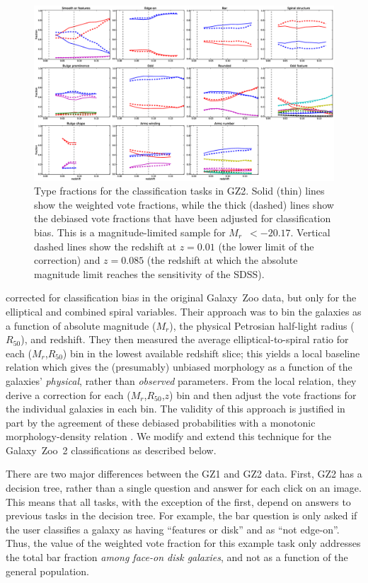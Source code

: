 \documentclass[useAMS,usenatbib]{mn2e}
\newcommand{\mr}{$M_r$}
\newcommand{\rfifty}{$R_{50}$}
\begin{document}
\begin{figure}
\includegraphics[angle=0,width=7.0in]{figures/gz2_type_fractions.eps}
\caption{Type fractions for the classification tasks in GZ2. Solid (thin) lines show the weighted vote fractions, while the thick (dashed) lines show the debiased vote fractions that have been adjusted for classification bias. This is a magnitude-limited sample for \mr~$<-20.17$. Vertical dashed lines show the redshift at $z=0.01$ (the lower limit of the correction) and $z=0.085$ (the redshift at which the absolute magnitude limit reaches the sensitivity of the SDSS). 
\label{fig-type_fractions}}
\end{figure}

\citet{bam09} corrected for classification bias in the original Galaxy~Zoo data, but only for the elliptical and combined spiral variables. Their approach was to bin the galaxies as a function of absolute magnitude (\mr), the physical Petrosian half-light radius (\rfifty), and redshift. They then measured the average elliptical-to-spiral ratio for each (\mr,\rfifty) bin in the lowest available redshift slice; this yields a local baseline relation which gives the (presumably) unbiased morphology as a function of the galaxies' {\em physical}, rather than {\em observed} parameters. From the local relation, they derive a correction for each (\mr,\rfifty,$z$) bin and then adjust the vote fractions for the individual galaxies in each bin. The validity of this approach is justified in part by the agreement of these debiased probabilities with a monotonic morphology-density relation \citep{bam09}. We modify and extend this technique for the Galaxy~Zoo~2 classifications as described below. 

There are two major differences between the GZ1 and GZ2 data. First, GZ2 has a decision tree, rather than a single question and answer for each click on an image. This means that all tasks, with the exception of the first, depend on answers to previous tasks in the decision tree. For example, the bar question is only asked if the user classifies a galaxy as having ``features or disk'' and as ``not edge-on''. Thus, the value of the weighted vote fraction for this example task only addresses the total bar fraction {\em among face-on disk galaxies}, and not as a function of the general population. 
\end{document}
